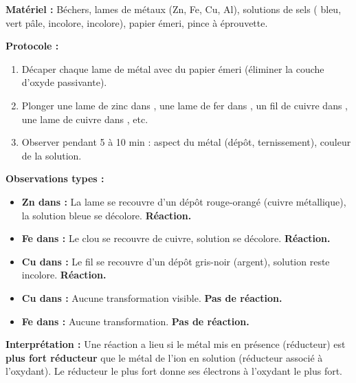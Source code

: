 \documentclass[11pt]{article}
\begin{document}
\begin{experience}
\textbf{Matériel :} Béchers, lames de métaux (Zn, Fe, Cu, Al), solutions de sels ( bleu,  vert pâle,  incolore,  incolore), papier émeri, pince à éprouvette.

\textbf{Protocole :}
\begin{enumerate}
    \item Décaper chaque lame de métal avec du papier émeri (éliminer la couche d'oxyde passivante).
    \item Plonger une lame de zinc dans , une lame de fer dans , un fil de cuivre dans , une lame de cuivre dans , etc.
    \item Observer pendant 5 à 10 min : aspect du métal (dépôt, ternissement), couleur de la solution.
\end{enumerate}

\textbf{Observations types :}
\begin{itemize}
    \item \textbf{Zn dans  :} La lame se recouvre d'un dépôt rouge-orangé (cuivre métallique), la solution bleue se décolore. \textbf{Réaction.}
    \item \textbf{Fe dans  :} Le clou se recouvre de cuivre, solution se décolore. \textbf{Réaction.}
    \item \textbf{Cu dans  :} Le fil se recouvre d'un dépôt gris-noir (argent), solution reste incolore. \textbf{Réaction.}
    \item \textbf{Cu dans  :} Aucune transformation visible. \textbf{Pas de réaction.}
    \item \textbf{Fe dans  :} Aucune transformation. \textbf{Pas de réaction.}
\end{itemize}

\textbf{Interprétation :}
Une réaction a lieu si le métal mis en présence (réducteur) est \textbf{plus fort réducteur} que le métal de l'ion en solution (réducteur associé à l'oxydant). Le réducteur le plus fort donne ses électrons à l'oxydant le plus fort.
\end{experience}
\end{document}
